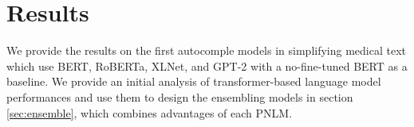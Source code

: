 \documentclass[11pt]{article}
\begin{document}
\begin{table}
    \centering
    \caption{An example of sentence pair in Medical Wikipedia parallel corpus.}
    \label{tab:medexample}
\end{table}

\begin{table}
    \centering
    \caption{Number of sentence pairs for General Domain and Medical Domain. The two corpora are exclusive.}
    \label{tab:medsize}
\end{table}

\section{Results} \label{sec:results}

We provide the results on the first autocomple models in simplifying medical text which use BERT, RoBERTa, XLNet, and GPT-2 with a no-fine-tuned BERT as a baseline. We provide an initial analysis of transformer-based language model performances and use them to design the ensembling models in section \ref{sec:ensemble}, which combines advantages of each PNLM.
\end{document}
